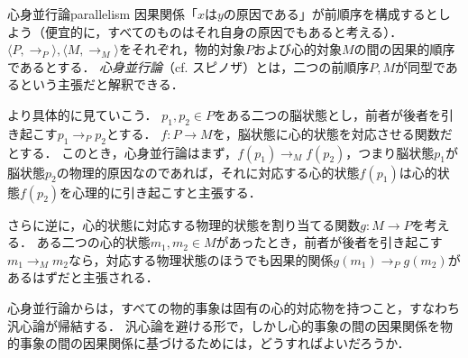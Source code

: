 \documentclass[dvipdfmx,11pt,a4paper]{jsarticle}
\begin{document}
\begin{rei}{心身並行論}{parallelism}
因果関係「$x$は$y$の原因である」が前順序を構成するとしよう（便宜的に，すべてのものはそれ自身の原因でもあると考える）．
$\langle P, \to_P \rangle, \langle M, \to_M \rangle$をそれぞれ，物的対象$P$および心的対象$M$の間の因果的順序であるとする．
\emph{心身並行論}（cf. スピノザ）とは，二つの前順序$P, M$が同型であるという主張だと解釈できる．

より具体的に見ていこう．
$p_1, p_2 \in P$をある二つの脳状態とし，前者が後者を引き起こす$p_1 \to_P p_2$とする．
$f: P \to M$を，脳状態に心的状態を対応させる関数だとする．
このとき，心身並行論はまず，$f(p_1) \to_M f(p_2)$，つまり脳状態$p_1$が脳状態$p_2$の物理的原因なのであれば，それに対応する心的状態$f(p_1)$は心的状態$f(p_2)$を心理的に引き起こすと主張する．

さらに逆に，心的状態に対応する物理的状態を割り当てる関数$g: M \to P$を考える．
ある二つの心的状態$m_1, m_2 \in M$があったとき，前者が後者を引き起こす$m_1 \to_M m_2$なら，対応する物理状態のほうでも因果的関係$g(m_1) \to_P g(m_2)$があるはずだと主張される．
\end{rei}

\begin{hatten}{}{}
心身並行論からは，すべての物的事象は固有の心的対応物を持つこと，すなわち汎心論が帰結する．
汎心論を避ける形で，しかし心的事象の間の因果関係を物的事象の間の因果関係に基づけるためには，どうすればよいだろうか．
\end{hatten}


\end{document}
